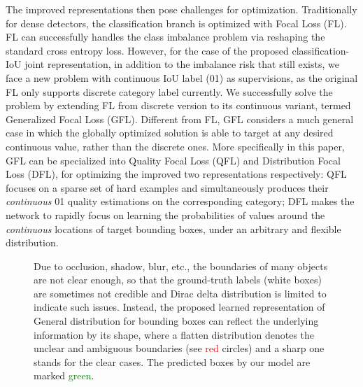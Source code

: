 \documentclass{article}
\begin{document}
The improved representations then pose challenges for optimization. Traditionally for dense detectors, the classification branch is optimized with Focal Loss \cite{lin2017focal} (FL). FL can successfully handles the class imbalance problem via reshaping the standard cross entropy loss. However, for the case of the proposed classification-IoU joint representation, in addition to the imbalance risk that still exists, we face a new problem with continuous IoU label (01) as supervisions, as the original FL only supports discrete  category label currently. We successfully solve the problem by extending FL from  discrete version to its continuous variant, termed Generalized Focal Loss (GFL). Different from FL, GFL considers a much general case in which the globally optimized solution is able to target at any desired continuous value, rather than the discrete ones. More specifically in this paper, GFL can be specialized into Quality Focal Loss (QFL) and Distribution Focal Loss (DFL), for optimizing the improved two representations respectively: QFL focuses on a sparse set of hard examples and simultaneously produces their \emph{continuous} 01 quality estimations on the corresponding category; DFL makes the network to rapidly focus on learning the probabilities of values around the \emph{continuous} locations of target bounding boxes, under an arbitrary and flexible distribution.






\begin{figure}[t]
\vspace{-6pt}
	\begin{center}
		\setlength{\fboxrule}{0pt}
	\end{center}	
	\vspace{-14pt}
	\caption{Due to occlusion, shadow, blur, etc., the boundaries of many objects are not clear enough, so that the ground-truth labels (white boxes) are sometimes not credible and Dirac delta distribution is limited to indicate such issues. Instead, the proposed learned representation of General distribution for bounding boxes can reflect the underlying information by its shape, where a flatten distribution denotes the unclear and ambiguous boundaries (see \textcolor{red}{red} circles) and a sharp one stands for the clear cases. The predicted boxes by our model are marked \textcolor{green}{green}. }
	\label{fig_DFL_drawback_22_cropped}
	\vspace{-14pt}
\end{figure}
\end{document}

